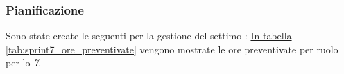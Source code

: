 \subsubsection{Pianificazione}
\label{sec:sprint7_pianificazione}
Sono state create le seguenti  per la gestione del settimo : 
\hyperref[tab:sprint7_ore_preventivate]{In tabella \ref{tab:sprint7_ore_preventivate}} vengono mostrate le ore preventivate per ruolo per lo \textit{ 7}.

\begin{table}[H]
    \centering
    \caption{Ore preventivate per ruolo  7}
    \label{tab:sprint7_ore_preventivate}
\end{table}